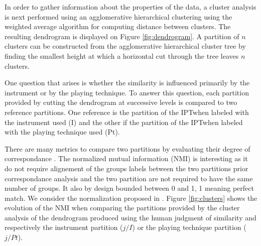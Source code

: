 \documentclass{article}
\newcommand{\ipt}{IPT}
\begin{document}
In order to gather information about the properties of the data, a cluster analysis is next performed using an agglomerative hierarchical clustering \cite{gordon1987review} using the weighted average algorithm for computing distance between clusters. The resulting dendrogram is displayed on Figure \ref{fig:dendrogram}. A partition of $n$ clusters can be constructed from the agglomerative hierarchical cluster tree by finding the smallest height at which a horizontal cut through the tree leaves $n$ clusters.

One question that arises is whether the similarity is influenced primarily by the instrument or by the playing technique. To answer this question, each partition provided by cutting the dendrogram at successive levels is compared to two reference partitions. One reference is the partition of the \ipt when labeled with the instrument used (I) and the other if the partition of the \ipt when labeled with the playing technique used (Pt).

There are many metrics to compare two partitions by evaluating their degree of correspondance \cite{wagner2007comparing}. The normalized mutual information (NMI) is interesting as it do not require alignement of the groups labels between the two partitions prior correspondance analysis and the two partition are not required to have the same number of groups. It also by design bounded between 0 and 1, 1 meaning perfect match. We consider the normalization proposed in \cite{strehl2002cluster}. Figure \ref{fig:clusters} shows the evolution of the NMI when comparing the partitions provided by the cluster analysis of the dendrogram produced using the human judgment of similarity and respectively the instrument partition ($j/I$) or the playing technique partition ($j/Pt$).
\end{document}
